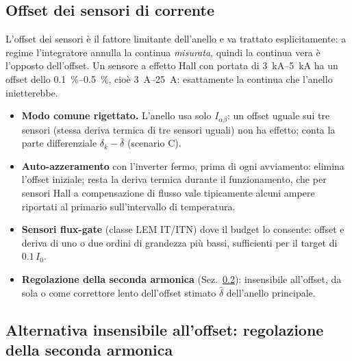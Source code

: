 \documentclass[10pt,a4paper]{scrartcl}
\newcommand{\Izero}{I_0}
\newcommand{\ab}{\alpha\beta}
\newcommand{\Iab}{I_{\ab}}
\begin{document}
\begin{onehalfspace}
\subsection{Offset dei sensori di corrente}
\label{sec:offset}

L'offset dei sensori è il fattore limitante dell'anello e va trattato esplicitamente: a regime l'integratore annulla la continua \emph{misurata}, quindi la continua vera è l'opposto dell'offset. Un sensore a effetto Hall con portata di \SIrange{3}{5}{kA} ha un offset dello \SIrange{0.1}{0.5}{\percent}, cioè \SIrange{3}{25}{A}: esattamente la continua che l'anello inietterebbe.
\begin{itemize}
\item \textbf{Modo comune rigettato.} L'anello usa solo $\Iab$: un offset uguale sui tre sensori (stessa deriva termica di tre sensori uguali) non ha effetto; conta la parte differenziale $\delta_k - \bar\delta$ (scenario C).
\item \textbf{Auto-azzeramento} con l'inverter fermo, prima di ogni avviamento: elimina l'offset iniziale; resta la deriva termica durante il funzionamento, che per sensori Hall a compensazione di flusso vale tipicamente alcuni ampere riportati al primario sull'intervallo di temperatura.
\item \textbf{Sensori flux-gate} (classe LEM IT/ITN) dove il budget lo consente: offset e deriva di uno o due ordini di grandezza più bassi, sufficienti per il target di $\num{0.1}\,\Izero$.
\item \textbf{Regolazione della seconda armonica} (Sez.~\ref{sec:secondaarmonica}): insensibile all'offset, da sola o come correttore lento dell'offset stimato $\hat\delta$ dell'anello principale.
\end{itemize}

\subsection{Alternativa insensibile all'offset: regolazione della seconda armonica}
\label{sec:secondaarmonica}


\end{onehalfspace}
\end{document}

